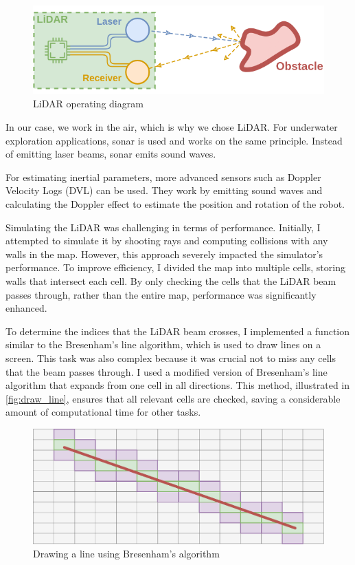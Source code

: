 \documentclass[../main.tex]{subfiles}
\begin{document}
\begin{figure}[H]
	\centering
	\includegraphics[width=0.6\linewidth]{IMAGES/part5/lidar_operation_scheme.png}
	\caption{LiDAR operating diagram}
	\label{fig:lidar_operation}
\end{figure}

In our case, we work in the air, which is why we chose LiDAR. For underwater exploration applications, sonar is used and works on the same principle. Instead of emitting laser beams, sonar emits sound waves. 

\vspace{0.5em}

For estimating inertial parameters, more advanced sensors such as Doppler Velocity Logs (DVL) can be used. They work by emitting sound waves and calculating the Doppler effect to estimate the position and rotation of the robot.

\vspace{1em}

Simulating the LiDAR was challenging in terms of performance. Initially, I attempted to simulate it by shooting rays and computing collisions with any walls in the map. However, this approach severely impacted the simulator's performance. To improve efficiency, I divided the map into multiple cells, storing walls that intersect each cell. By only checking the cells that the LiDAR beam passes through, rather than the entire map, performance was significantly enhanced.

\vspace{1em}

To determine the indices that the LiDAR beam crosses, I implemented a function similar to the Bresenham's line algorithm, which is used to draw lines on a screen. This task was also complex because it was crucial not to miss any cells that the beam passes through. I used a modified version of Bresenham's line algorithm that expands from one cell in all directions. This method, illustrated in \autoref{fig:draw_line}, ensures that all relevant cells are checked, saving a considerable amount of computational time for other tasks.\cite{bresenham_wiki_2025}

\begin{figure}[H]
	\centering
	\includegraphics[width=0.6\linewidth]{IMAGES/part5/draw_line.png}
	\caption{Drawing a line using Bresenham's algorithm}
	\label{fig:draw_line}
\end{figure}
\end{document}

